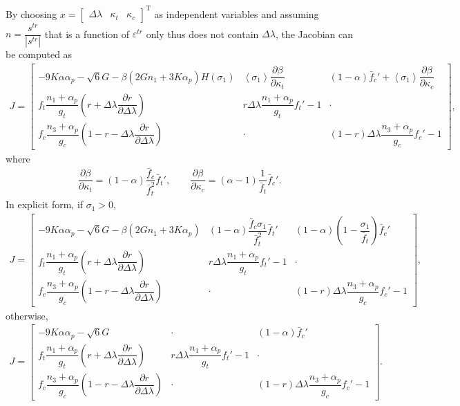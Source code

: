 \documentclass[10pt,fleqn,3p]{elsarticle}
\newcommand*{\mT}{\mathrm{T}}
\newcommand*{\pfrac}[2]{\dfrac{\partial#1}{\partial#2}}
\begin{document}
By choosing $x=\begin{bmatrix}
\Delta\lambda&\kappa_t&\kappa_c
\end{bmatrix}^\mT$ as independent variables and assuming $n=\dfrac{s^{tr}}{|s^{tr}|}$ that is a function of $\varepsilon^{tr}$ only thus does not contain $\Delta\lambda$, the Jacobian can be computed as
\begin{gather*}
J=\begin{bmatrix}
-9K\alpha\alpha_p-\sqrt{6}G-\beta\left(2Gn_1+3K\alpha_p\right)H(\sigma_1)&\left\langle\sigma_1\right\rangle\pfrac{\beta}{\kappa_t}&(1-\alpha)\bar{f}_c'+\left\langle\sigma_1\right\rangle\pfrac{\beta}{\kappa_c}\\[4mm]
f_t\dfrac{n_1+\alpha_p}{g_t}(r+\Delta\lambda\pfrac{r}{\Delta\lambda})&r\Delta\lambda\dfrac{n_1+\alpha_p}{g_t}f_t'-1&\cdot\\[4mm]
f_c\dfrac{n_3+\alpha_p}{g_c}(1-r-\Delta\lambda\pfrac{r}{\Delta\lambda})&\cdot&(1-r)\Delta\lambda\dfrac{n_3+\alpha_p}{g_c}f_c'-1
\end{bmatrix},
\end{gather*}
where
\begin{gather*}
\pfrac{\beta}{\kappa_t}=(1-\alpha)\dfrac{\bar{f}_c}{\bar{f}_t^2}\bar{f}_t',\qquad\pfrac{\beta}{\kappa_c}=(\alpha-1)\dfrac{1}{\bar{f}_t}\bar{f}_c'.
\end{gather*}
In explicit form, if $\sigma_1>0$,
\begin{gather}
J=\begin{bmatrix}
-9K\alpha\alpha_p-\sqrt{6}G-\beta\left(2Gn_1+3K\alpha_p\right)&(1-\alpha)\dfrac{\bar{f}_c\sigma_1}{\bar{f}_t^2}\bar{f}_t'&(1-\alpha)(1-\dfrac{\sigma_1}{\bar{f}_t})\bar{f}_c'\\[4mm]
f_t\dfrac{n_1+\alpha_p}{g_t}(r+\Delta\lambda\pfrac{r}{\Delta\lambda})&r\Delta\lambda\dfrac{n_1+\alpha_p}{g_t}f_t'-1&\cdot\\[4mm]
f_c\dfrac{n_3+\alpha_p}{g_c}(1-r-\Delta\lambda\pfrac{r}{\Delta\lambda})&\cdot&(1-r)\Delta\lambda\dfrac{n_3+\alpha_p}{g_c}f_c'-1
\end{bmatrix},
\end{gather}
otherwise,
\begin{gather}
J=\begin{bmatrix}
-9K\alpha\alpha_p-\sqrt{6}G&\cdot&(1-\alpha)\bar{f}_c'\\[4mm]
f_t\dfrac{n_1+\alpha_p}{g_t}(r+\Delta\lambda\pfrac{r}{\Delta\lambda})&r\Delta\lambda\dfrac{n_1+\alpha_p}{g_t}f_t'-1&\cdot\\[4mm]
f_c\dfrac{n_3+\alpha_p}{g_c}(1-r-\Delta\lambda\pfrac{r}{\Delta\lambda})&\cdot&(1-r)\Delta\lambda\dfrac{n_3+\alpha_p}{g_c}f_c'-1
\end{bmatrix}.
\end{gather}
\end{document}
